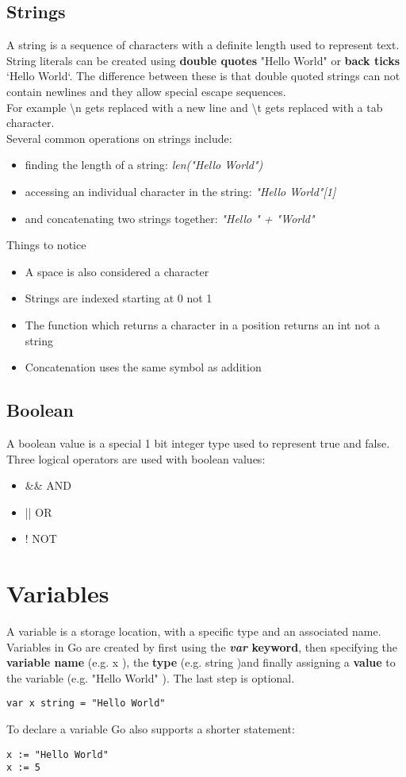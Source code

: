 \documentclass[10pt,letterpaper]{report}
\begin{document}
\section{Strings}
A string is a sequence of characters with a definite length used to represent text.\\
String literals can be created using \textbf{double quotes} "Hello World" or \textbf{back ticks} `Hello World`. The difference between these is that double quoted strings can not contain newlines and they allow special escape sequences.\\
For example \textbackslash n gets replaced with a new line and \textbackslash t gets replaced with a tab character.\\
Several common operations on strings include:
\begin{itemize}
\item finding the length of a string: \textit{len("Hello World")}
\item accessing an individual character in the string: \textit{"Hello World"[1]}
\item and concatenating two strings together: \textit{"Hello " + "World"}
\end{itemize} 
Things to notice
\begin{itemize}
\item A space is also considered a character
\item Strings are indexed starting at 0 not 1
\item The function which returns a character in a position returns an int not a string
\item Concatenation uses the same symbol as addition
\end{itemize}
\section{Boolean}
A boolean value is a special 1 bit integer type used to represent true and false.\\
Three logical operators are used with boolean values:
\begin{itemize}
\item \&\& AND
\item || OR
\item ! NOT
\end{itemize}
\chapter{Variables}
A variable is a storage location, with a specific type and an associated name.\\
Variables in Go are created by first using the \textbf{\textit{var} keyword}, then specifying the \textbf{variable name} (e.g. x ), the \textbf{type} (e.g. string )and finally assigning a \textbf{value} to the variable (e.g. "Hello World" ). The last step is optional.
\begin{lstlisting}
var x string = "Hello World"
\end{lstlisting}
To declare a variable Go also supports a shorter statement:
\begin{lstlisting}
x := "Hello World"
x := 5
\end{lstlisting}
\end{document}
